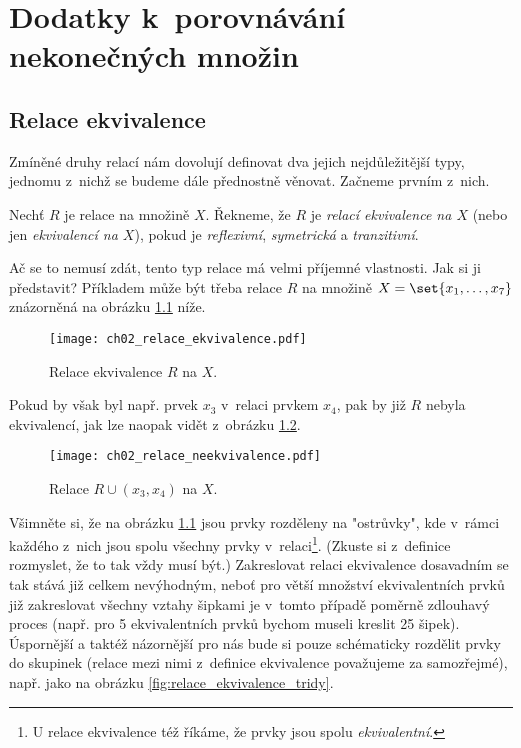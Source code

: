\chapter{Dodatky k~porovnávání nekonečných množin}\label{chap:dodatky_k_porovnavani_nekonecnych_mn}
\section{Relace ekvivalence}\label{sec:relace_ekvivalence}
Zmíněné druhy relací nám dovolují definovat dva jejich nejdůležitější typy, jednomu z~nichž se budeme dále přednostně věnovat. Začneme prvním z~nich.
\begin{definition}\label{def:relace_ekvivalence}
    Nechť $R$ je relace na množině $X$. Řekneme, že $R$ je \emph{relací ekvivalence na $X$} (nebo jen \emph{ekvivalencí na $X$}), pokud je \emph{reflexivní}, \emph{symetrická} a \emph{tranzitivní}.
\end{definition}
Ač se to nemusí zdát, tento typ relace má velmi příjemné vlastnosti. Jak si ji představit? Příkladem může být třeba relace $R$ na množině $X=\set{x_1,\dots,x_7}$ znázorněná na obrázku \ref{fig:priklad_relace_ekvivalence} níže.
\begin{figure}[H]
    \centering
    \texttt{[image: ch02\_relace\_ekvivalence.pdf]}
    \caption{Relace ekvivalence $R$ na $X$.}
    \label{fig:priklad_relace_ekvivalence}
\end{figure}
Pokud by však byl např. prvek $x_3$ v~relaci prvkem $x_4$, pak by již $R$ nebyla ekvivalencí, jak lze naopak vidět z~obrázku \ref{fig:priklad_relace_neekvivalence}.
\begin{figure}[H]
    \centering
    \texttt{[image: ch02\_relace\_neekvivalence.pdf]}
    \caption{Relace $R \cup (x_3,x_4)$ na $X$.}
    \label{fig:priklad_relace_neekvivalence}
\end{figure}
Všimněte si, že na obrázku \ref{fig:priklad_relace_ekvivalence} jsou prvky rozděleny na "ostrůvky", kde v~rámci každého z~nich jsou spolu všechny prvky v~relaci\footnote{U relace ekvivalence též říkáme, že prvky jsou spolu \emph{ekvivalentní}.}. (Zkuste si z~definice rozmyslet, že to tak vždy musí být.) Zakreslovat relaci ekvivalence dosavadním se tak stává již celkem nevýhodným, neboť pro větší množství ekvivalentních prvků již zakreslovat všechny vztahy šipkami je v~tomto případě poměrně zdlouhavý proces (např. pro 5 ekvivalentních prvků bychom museli kreslit 25 šipek). Úspornější a taktéž názornější pro nás bude si pouze schématicky rozdělit prvky do skupinek (relace mezi nimi z~definice ekvivalence považujeme za samozřejmé), např. jako na obrázku \ref{fig:relace_ekvivalence_tridy}.

